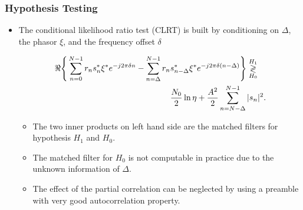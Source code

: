 \begin{frame}
    \frametitle{Hypothesis Testing}
    \begin{itemize}

      \item The conditional likelihood ratio test (CLRT) is built by conditioning on $\Delta$, the phasor $\xi$, and the frequency offset $\delta$
  
      \begin{equation}
          \label{eq:log likelihood}
          \begin{aligned}
          \Re\Bigg\{\sum_{n=0}^{N-1}r_ns_n^*\xi^*e^{-j2\pi\delta n}-\sum_{n=\Delta}^{N-1}r_n&s_{n-\Delta}^*\xi^*e^{-j2\pi\delta(n-\Delta)}\Bigg\} \mathrel{\mathop\gtrless\limits^{H_1}_{H_0}} \\
          &\frac{N_0}{2}\ln\eta+\frac{A^2}{2}\sum_{n=N-\Delta}^{N-1}|s_n|^2.
          \end{aligned}
      \end{equation}
  
      \begin{itemize}
          \item The two inner products on left hand side are the matched filters for hypothesis $H_1$ and $H_0$.
          \item The matched filter for $H_0$ is not computable in practice due to the unknown information of $\Delta$.
          \item The effect of the partial correlation can be neglected by using a preamble with very good autocorrelation property.
      \end{itemize}
      
  \end{itemize}

\end{frame}

